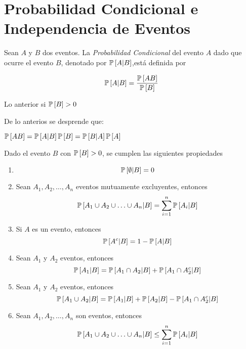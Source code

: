 \section{Probabilidad Condicional e Independencia de Eventos}
\begin{Def}
Sean $A$ y $B$ dos eventos. La {\em Probabilidad Condicional} del evento $A$ dado que ocurre el evento $B$, denotado por $\mathbb{P}\left[A|B\right]$,está definida por

\begin{equation}
\mathbb{P}\left[A|B\right]=\frac{\mathbb{P}\left[AB\right]}{\mathbb{P}\left[B\right]}
\end{equation}
\end{Def}

Lo anterior si $\mathbb{P}\left[B\right]>0$

De lo anterios se desprende que:

$\mathbb{P}\left[AB\right]=\mathbb{P}\left[A|B\right]\mathbb{P}\left[B\right]=\mathbb{P}\left[B|A\right]\mathbb{P}\left[A\right]$


\begin{Propty} Dado el evento $B$ con $\mathbb{P}\left[B\right]>0$, se cumplen las siguientes propiedades
\begin{enumerate}
\item \begin{equation}\mathbb{P}\left[\emptyset|B\right]=0\end{equation}
\item Sean $A_{1},A_{2},\ldots,A_{n}$ eventos mutuamente excluyentes, entonces
\begin{equation}
\mathbb{P}\left[A_{1}\cup A_{2}\cup \ldots\cup A_{n}|B\right]=\sum_{i=1}^{n}\mathbb{P}\left[A_{i}|B\right]
\end{equation}
\item Si $A$ es un evento, entonces
\begin{equation}
\mathbb{P}\left[A^{c}|B\right]=1-\mathbb{P}\left[A|B\right]
\end{equation}
\item Sean $A_{1}$ y $A_{2}$ eventos, entonces
\begin{equation}
\mathbb{P}\left[A_{1}|B\right]=\mathbb{P}\left[A_{1}\cap A_{2}|B\right]+\mathbb{P}\left[A_{1}\cap A_{2}^{c}|B\right]
\end{equation}
\item Sean $A_{1}$ y $A_{2}$ eventos, entonces
\begin{equation}
\mathbb{P}\left[A_{1}\cup A_{2}|B\right]=\mathbb{P}\left[A_{1}|B\right]+\mathbb{P}\left[A_{2}|B\right]-\mathbb{P}\left[A_{1}\cap A_{2}^{c}|B\right]
\end{equation}
\item Sean $A_{1},A_{2},\ldots,A_{n}$ son eventos, entonces
\begin{equation}
\mathbb{P}\left[A_{1}\cup A_{2}\cup \ldots\cup A_{n}|B\right]\leq\sum_{i=1}^{n}\mathbb{P}\left[A_{i}|B\right]
\end{equation}
\end{enumerate}
\end{Propty}


